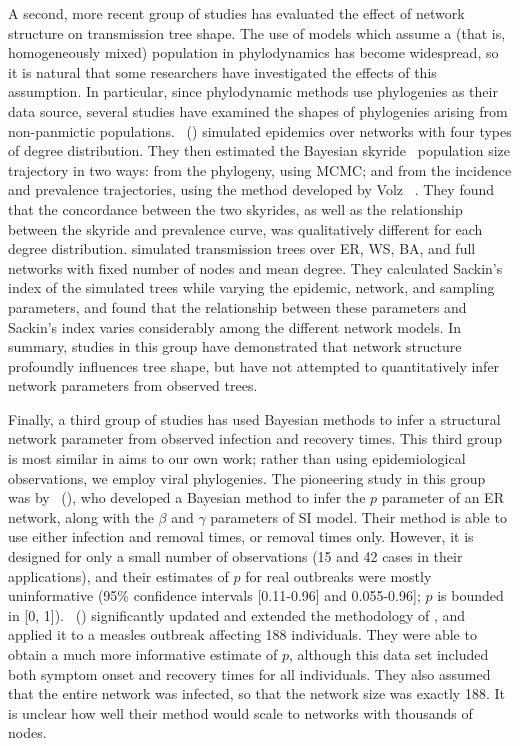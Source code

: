 A second, more recent group of studies has evaluated the effect of network
structure on transmission tree shape. The use of models which assume a
 (that is, homogeneously mixed) population in phylodynamics has
become widespread, so it is natural that some researchers have investigated the
effects of this assumption. In particular, since phylodynamic methods use
phylogenies as their data source, several studies have examined the shapes of
phylogenies arising from non-panmictic populations. 
\citeauthor{o2010contact}~(\citeyear{o2010contact}) simulated epidemics over
networks with four types of degree distribution. They then estimated the
Bayesian skyride~\autocite{minin2008smooth} population size trajectory in two
ways: from the phylogeny, using \gls{MCMC}; and from the incidence and
prevalence trajectories, using the method developed by Volz
\etal~\autocite{volz2009phylodynamics}. They found that the concordance between
the two skyrides, as well as the relationship between the skyride and
prevalence curve, was qualitatively different for each degree distribution.
\citeauthor{leventhal2012inferring} simulated transmission trees over \gls{ER},
\gls{WS}, \gls{BA}, and full networks with fixed number of nodes and mean
degree. They calculated Sackin's index of the simulated trees while varying the
epidemic, network, and sampling parameters, and found that the relationship
between these parameters and Sackin's index varies considerably among the
different network models. In summary, studies in this group have demonstrated
that network structure profoundly influences tree shape, but have not attempted
to quantitatively infer network parameters from observed trees.

Finally, a third group of studies has used Bayesian methods to infer a
structural network parameter from observed infection and recovery times. This
third group is most similar in aims to our own work; rather than using
epidemiological observations, we employ viral phylogenies. The pioneering study
in this group was by
\citeauthor{britton2002bayesian}~(\citeyear{britton2002bayesian}), who
developed a Bayesian method to infer the $p$ parameter of an \gls{ER} network,
along with the $\beta$ and $\gamma$ parameters of \gls{SI} model. Their method
is able to use either infection and removal times, or removal times only.
However, it is designed for only a small number of observations (15 and 42
cases in their applications), and their estimates of $p$ for real outbreaks
were mostly uninformative (95\% confidence intervals [0.11-0.96] and
0.055-0.96]; $p$ is bounded in [0, 1]).
\citeauthor{groendyke2011bayesian}~(\citeyear{groendyke2011bayesian})
significantly updated and extended the methodology of
\citeauthor{britton2002bayesian}, and applied it to a measles outbreak
affecting 188 individuals. They were able to obtain a much more informative
estimate of $p$, although this data set included both symptom onset and
recovery times for all individuals. They also assumed that the entire network
was infected, so that the network size was exactly 188. It is unclear how well
their method would scale to networks with thousands of nodes.

